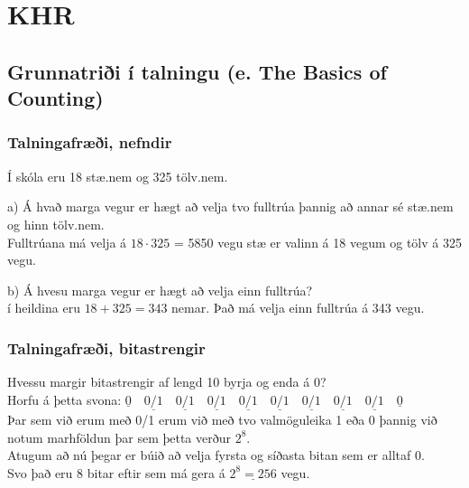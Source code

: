 \section{KHR}
\subsection{Grunnatriði í talningu (e. The Basics of Counting)}
\subsubsection{Talningafræði, nefndir}
Í skóla eru 18 stæ.nem og 325 tölv.nem.\vspace*{0.5em}

a) Á hvað marga vegur er hægt að velja tvo fulltrúa þannig að annar sé stæ.nem \hspace*{2.3em}og hinn tölv.nem.\\
\hspace*{2.3em}Fulltrúana má velja á $18 \cdot 325$ = 5850 vegu stæ er valinn á 18 vegum og tölv \hspace*{2.3em}á 325 vegu.\vspace*{0.7em}

b) Á hvesu marga vegur er hægt að velja einn fulltrúa?\\
\hspace*{2.3em} í heildina eru $18+ 325 = 343$ nemar. Það má velja einn  fulltrúa á 343 vegu.

\subsubsection{Talningafræði, bitastrengir}
Hvessu margir bitastrengir af lengd 10 byrja og enda á 0?\\
Horfu á þetta svona: $\underline{0}\quad\underline{0/1}\quad\underline{0/1}\quad\underline{0/1}\quad\underline{0/1}\quad\underline{0/1}\quad\underline{0/1}\quad\underline{0/1}\quad\underline{0/1}\quad\underline{0}$\vspace*{0.5em}\\ 
Þar sem við erum með 0/1 erum við með tvo valmöguleika 1 eða 0 þannig við notum marhföldun þar sem þetta verður $2^8$.\vspace*{0.5em}\\ 
Atugum að nú þegar er búið að velja fyrsta og síðasta bitan sem er alltaf 0.\\ 
Svo það eru 8 bitar eftir sem má gera á $\underline{2^8 = 256}$ vegu.


